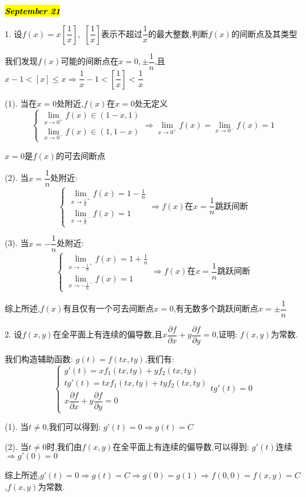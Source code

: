 \hl{\textbf{\textit{September 21}}}

1. 设$f(x)=x[\dfrac{1}{x}]$,\ $[\dfrac{1}{x}]$表示不超过$\dfrac{1}{x}$的最大整数,判断$f(x)$的间断点及其类型
\begin{solution}

	我们发现$f(x)$可能的间断点在$x=0,\pm \dfrac{1}{n}$,且$x-1<[x]\leq x\Rightarrow \dfrac{1}{x}-1<[\dfrac{1}{x}]<\dfrac{1}{x}$
	
	(1). 当在$x=0$处附近,$f(x)$在$x=0$处无定义
	$$\left\lbrace
	\begin{array}{l}
		\lim\limits_{x\rightarrow 0^{+}}f(x)\in(1-x,1)\\
		\lim\limits_{x\rightarrow 0^{-}}f(x)\in(1,1-x)
	\end{array}
	\right. \Rightarrow \lim\limits_{x\rightarrow 0^{+}}f(x)=\lim\limits_{x\rightarrow 0^{-}}f(x)=1$$
	
	$x=0$是$f(x)$的可去间断点
	
	(2). 当$x=\dfrac{1}{n}$处附近:  
	$$\left\lbrace
	\begin{array}{l}
		\lim\limits_{x\rightarrow \frac{1}{n}^{+}}f(x)=1-\frac{1}{n}\\
		\lim\limits_{x\rightarrow \frac{1}{n}^{-}}f(x)=1
	\end{array}
	\right. \Rightarrow f(x)\text{在}x=\dfrac{1}{n}\text{跳跃间断}$$
	
	(3). 当$x=-\dfrac{1}{n}$处附近:  
	$$\left\lbrace
	\begin{array}{l}
		\lim\limits_{x\rightarrow -\frac{1}{n}^{+}}f(x)=1+\frac{1}{n}\\
		\lim\limits_{x\rightarrow -\frac{1}{n}^{-}}f(x)=1
	\end{array}
	\right. \Rightarrow f(x)\text{在}x=\dfrac{1}{n}\text{跳跃间断}$$
	
	综上所述,$f(x)$有且仅有一个可去间断点$x=0$,有无数多个跳跃间断点$x=\pm \dfrac{1}{n}$
\end{solution}

2. 设$f(x,y)$在全平面上有连续的偏导数,且$x\dfrac{\partial f}{\partial x}+y\dfrac{\partial f}{\partial y}=0$,证明:  $f(x,y)$为常数.
\begin{solution}

	我们构造辅助函数:  $g(t)=f(tx,ty)$,我们有:  
	$$\left\lbrace
	\begin{array}{l}
		g'(t)=xf_{1}(tx,ty)+yf_{2}(tx,ty)\\
		tg'(t)=txf_{1}(tx,ty)+tyf_{2}(tx,ty)\\
		x\dfrac{\partial f}{\partial x}+y\dfrac{\partial f}{\partial y}=0
	\end{array}
	\right. tg'(t)=0$$
	
	(1). 当$t\neq 0$,我们可以得到:  $g'(t)=0\Rightarrow g(t)=C$
	
	(2). 当$t\neq 0$时,我们由$f(x,y)$在全平面上有连续的偏导数,可以得到:  $g'(t)$连续$\Rightarrow g'(0)=0$
	
	综上所述,$g'(t)=0\Rightarrow g(t)=C\Rightarrow g(0)=g(1)\Rightarrow f(0,0)=f(x,y)=C$,$f(x,y)$为常数.
\end{solution}

